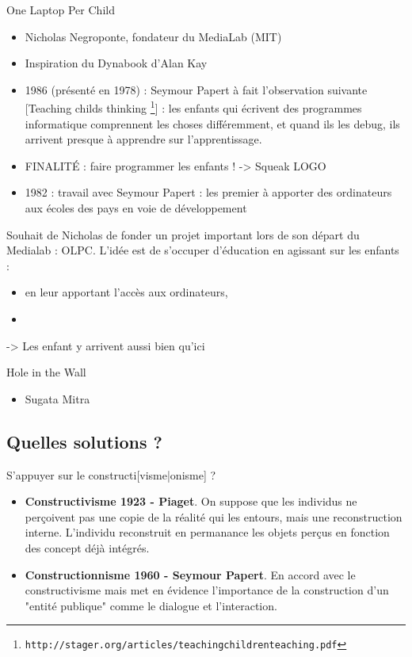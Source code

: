 \begin{frame}{One Laptop Per Child}
  \begin{itemize}
   \item Nicholas  Negroponte, fondateur du MediaLab (MIT)
   \item Inspiration du Dynabook d'Alan Kay
   \item 1986 (présenté en 1978) : Seymour Papert à fait l'observation suivante [Teaching childs thinking \footnote{\texttt{http://stager.org/articles/teachingchildrenteaching.pdf}}] : les enfants qui écrivent des programmes informatique comprennent les choses différemment, et quand ils les debug, ils arrivent presque à apprendre sur l'apprentissage.
   \item FINALITÉ : faire programmer les enfants ! -> Squeak LOGO 
   \item 1982 : travail avec Seymour Papert : les premier à apporter des ordinateurs aux écoles des pays en voie de développement
  \end{itemize}
  Souhait de Nicholas de fonder un projet important lors de son départ du Medialab : OLPC. L'idée est de s'occuper d'éducation en agissant sur les enfants :
  \begin{itemize}
  \item en leur apportant l'accès aux ordinateurs,
  \item 
  \end{itemize}
  -> Les enfant y arrivent aussi bien qu'ici
\end{frame}

\begin{frame}{Hole in the Wall}
  \begin{itemize}
    \item Sugata Mitra  
  \end{itemize}
\end{frame}

\subsection{Quelles solutions ?}

\begin{frame}{S'appuyer sur le constructi[visme|onisme] ?}
\begin{itemize}
  \item \textbf{Constructivisme 1923 - Piaget}. On suppose que les individus ne perçoivent pas une copie de la réalité qui les entours, mais une reconstruction interne. L'individu reconstruit en permanance les objets perçus en fonction des concept déjà intégrés.
  \item \textbf{Constructionnisme 1960 - Seymour Papert}. En accord avec le constructivisme mais met en évidence l'importance de la construction d'un "entité publique" comme le dialogue et l'interaction.
\end{itemize}
\end{frame}


